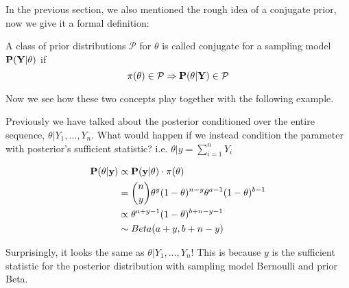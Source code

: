 In the previous section, we also mentioned the rough idea of a conjugate prior, now we give it a formal definition:
\begin{definition}
    A class of prior distributions $\mathcal{P}$ for $\theta$ is called conjugate for a sampling model $\bf{P}(Y|\theta)$ if
    \begin{equation*}
        \pi(\theta) \in \mathcal{P} \Rightarrow \bf{P}(\theta | Y) \in \mathcal{P}
    \end{equation*}
\end{definition}

Now we see how these two concepts play together with the following example.
\begin{example}
    Previously we have talked about the posterior conditioned over the entire sequence, $\theta | Y_1, \ldots, Y_n$. What would happen if we instead condition the parameter with posterior's sufficient statistic? i.e. $\theta | y=\sum_{i=1}^{n}Y_i$

    \begin{align*}
        \bf{P}(\theta | y) &\propto \bf{P}(y | \theta) \cdot \pi(\theta) \\
        &= \binom{n}{y} \theta^{y}(1-\theta)^{n-y} \theta^{a-1}(1-\theta)^{b-1} \\
        &\propto \theta^{a + y - 1}(1-\theta)^{b + n - y - 1} \\
        &\sim Beta(a+y, b+n-y)
    \end{align*}

    Surprisingly, it looks the same as $\theta | Y_1, \ldots, Y_n$! This is because $y$ is the sufficient statistic for the posterior distribution with sampling model Bernoulli and prior Beta. 
\end{example}